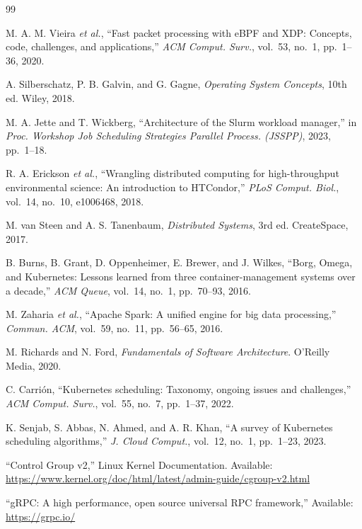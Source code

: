 \renewcommand{\bibname}{References}
\begin{thebibliography}{99}

M. A. M. Vieira \textit{et al.},
``Fast packet processing with eBPF and XDP: Concepts, code, challenges, and applications,''
\textit{ACM Comput. Surv.}, vol.~53, no.~1, pp.~1--36, 2020.

A. Silberschatz, P. B. Galvin, and G. Gagne,
\textit{Operating System Concepts}, 10th ed.
Wiley, 2018.

M. A. Jette and T. Wickberg,
``Architecture of the Slurm workload manager,''
in \textit{Proc. Workshop Job Scheduling Strategies Parallel Process. (JSSPP)},
2023, pp.~1--18.

R. A. Erickson \textit{et al.},
``Wrangling distributed computing for high-throughput environmental science: An introduction to HTCondor,''
\textit{PLoS Comput. Biol.}, vol.~14, no.~10, e1006468, 2018.

M. van Steen and A. S. Tanenbaum,
\textit{Distributed Systems}, 3rd ed.
CreateSpace, 2017.

B. Burns, B. Grant, D. Oppenheimer, E. Brewer, and J. Wilkes,
``Borg, Omega, and Kubernetes: Lessons learned from three container-management systems over a decade,''
\textit{ACM Queue}, vol.~14, no.~1, pp.~70--93, 2016.

M. Zaharia \textit{et al.},
``Apache Spark: A unified engine for big data processing,''
\textit{Commun. ACM}, vol.~59, no.~11, pp.~56--65, 2016.

M. Richards and N. Ford,
\textit{Fundamentals of Software Architecture}.
O'Reilly Media, 2020.

C. Carrión,
``Kubernetes scheduling: Taxonomy, ongoing issues and challenges,''
\textit{ACM Comput. Surv.}, vol.~55, no.~7, pp.~1--37, 2022.

K. Senjab, S. Abbas, N. Ahmed, and A. R. Khan,
``A survey of Kubernetes scheduling algorithms,''
\textit{J. Cloud Comput.}, vol.~12, no.~1, pp.~1--23, 2023.

``Control Group v2,''
Linux Kernel Documentation.
Available: \url{https://www.kernel.org/doc/html/latest/admin-guide/cgroup-v2.html}

``gRPC: A high performance, open source universal RPC framework,''
Available: \url{https://grpc.io/}

\end{thebibliography}
